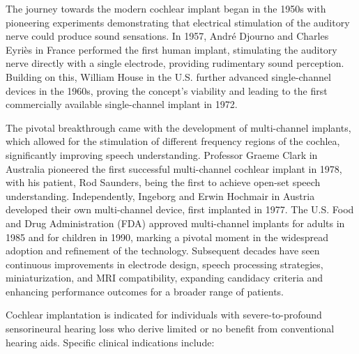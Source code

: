 The journey towards the modern cochlear implant began in the 1950s with pioneering experiments demonstrating that electrical stimulation of the auditory nerve could produce sound sensations. In 1957, Andr\'{e} Djourno and Charles Eyri\`{e}s in France performed the first human implant, stimulating the auditory nerve directly with a single electrode, providing rudimentary sound perception. Building on this, William House in the U.S. further advanced single-channel devices in the 1960s, proving the concept's viability and leading to the first commercially available single-channel implant in 1972.

The pivotal breakthrough came with the development of multi-channel implants, which allowed for the stimulation of different frequency regions of the cochlea, significantly improving speech understanding. Professor Graeme Clark in Australia pioneered the first successful multi-channel cochlear implant in 1978, with his patient, Rod Saunders, being the first to achieve open-set speech understanding. Independently, Ingeborg and Erwin Hochmair in Austria developed their own multi-channel device, first implanted in 1977. The U.S. Food and Drug Administration (FDA) approved multi-channel implants for adults in 1985 and for children in 1990, marking a pivotal moment in the widespread adoption and refinement of the technology. Subsequent decades have seen continuous improvements in electrode design, speech processing strategies, miniaturization, and MRI compatibility, expanding candidacy criteria and enhancing performance outcomes for a broader range of patients.

Cochlear implantation is indicated for individuals with severe-to-profound sensorineural hearing loss who derive limited or no benefit from conventional hearing aids. Specific clinical indications include:

